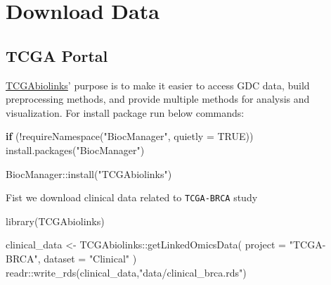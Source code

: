 \documentclass[
]{book}
\newenvironment{Shaded}{\begin{snugshade}}{\end{snugshade}}
\newcommand{\AttributeTok}[1]{\textcolor[rgb]{0.77,0.63,0.00}{#1}}
\newcommand{\ConstantTok}[1]{\textcolor[rgb]{0.00,0.00,0.00}{#1}}
\newcommand{\ControlFlowTok}[1]{\textcolor[rgb]{0.13,0.29,0.53}{\textbf{#1}}}
\newcommand{\FunctionTok}[1]{\textcolor[rgb]{0.00,0.00,0.00}{#1}}
\newcommand{\NormalTok}[1]{#1}
\newcommand{\OtherTok}[1]{\textcolor[rgb]{0.56,0.35,0.01}{#1}}
\newcommand{\SpecialCharTok}[1]{\textcolor[rgb]{0.00,0.00,0.00}{#1}}
\newcommand{\StringTok}[1]{\textcolor[rgb]{0.31,0.60,0.02}{#1}}
\begin{document}
\hypertarget{download-data}{%
\section{Download Data}\label{download-data}}

\hypertarget{tcga-portal}{%
\subsection{TCGA Portal}\label{tcga-portal}}

\href{https://bioconductor.org/packages/release/bioc/html/TCGAbiolinks.html}{TCGAbiolinks}' purpose is to make it easier to access GDC data, build preprocessing methods, and provide multiple methods for analysis and visualization. For install package run below commands:

\begin{Shaded}
\begin{Highlighting}[]
\ControlFlowTok{if}\NormalTok{ (}\SpecialCharTok{!}\FunctionTok{requireNamespace}\NormalTok{(}\StringTok{"BiocManager"}\NormalTok{, }\AttributeTok{quietly =} \ConstantTok{TRUE}\NormalTok{))}
    \FunctionTok{install.packages}\NormalTok{(}\StringTok{"BiocManager"}\NormalTok{)}

\NormalTok{BiocManager}\SpecialCharTok{::}\FunctionTok{install}\NormalTok{(}\StringTok{"TCGAbiolinks"}\NormalTok{)}
\end{Highlighting}
\end{Shaded}

Fist we download clinical data related to \texttt{TCGA-BRCA} study

\begin{Shaded}
\begin{Highlighting}[]
\FunctionTok{library}\NormalTok{(TCGAbiolinks)}

\NormalTok{clinical\_data }\OtherTok{\textless{}{-}}\NormalTok{ TCGAbiolinks}\SpecialCharTok{::}\FunctionTok{getLinkedOmicsData}\NormalTok{(}
  \AttributeTok{project =} \StringTok{"TCGA{-}BRCA"}\NormalTok{,}
  \AttributeTok{dataset =} \StringTok{"Clinical"}
\NormalTok{)}
\NormalTok{readr}\SpecialCharTok{::}\FunctionTok{write\_rds}\NormalTok{(clinical\_data,}\StringTok{"data/clinical\_brca.rds"}\NormalTok{)}
\end{Highlighting}
\end{Shaded}
\end{document}
